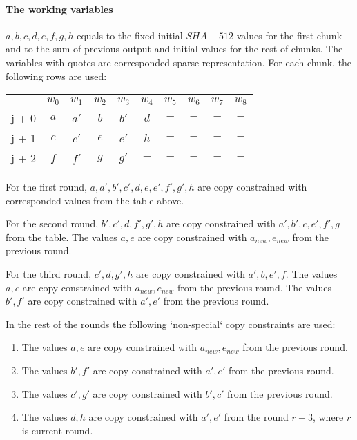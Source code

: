 \paragraph{The working variables}
$ a,  b , c , d, e, f, g, h$ equals to the fixed initial $SHA-512$ values for the first chunk and to the sum of previous output and initial values for the rest of chunks. 
The variables with quotes are corresponded sparse representation.
For each chunk, the following rows are used:
\begin{center}
    \begin{tabular}{ c|c|c|c|c|c|c|c|c|c }
        & $w_0$  & $w_1$  & $w_2$  & $w_3$  & $w_4$  & $w_5$ & $w_6$ & $w_7$ & $w_8$  \\
        \hline
        j + 0 & $a$ & $a'$ & $b$ & $b' $  & $d$  & $-$   & $-$ & $-$  & $-$   \\
        j + 1 & $c$  & $c'$ & $e$ & $e'$ & $h$ & $-$ & $-$ & $-$ & $-$ \\
        j + 2 & $f$ & $f'$ & $g$ & $g'$ & $-$ & $-$ & $-$ & $-$ & $-$\\
    \end{tabular}
\end{center}
For the first round, $a, a', b', c' , d, e, e', f', g', h$ are copy constrained with corresponded values from the table above.

For the second round, $b', c' , d, f', g', h$ are copy constrained with $a', b', c, e', f', g$ from the table.
The values $a, e$ are copy constrained with $a_{new}, e_{new}$ from the previous round.

For the third round, $c' , d, g', h$ are copy constrained with $a', b, e', f$.
The values $a, e$ are copy constrained with $a_{new}, e_{new}$ from the previous round.
The values $b', f'$ are copy constrained with $a', e'$ from the previous round.

In the rest of the rounds the following `non-special` copy constraints are used:
\begin{enumerate}
\item The values $a, e$ are copy constrained with $a_{new}, e_{new}$ from the previous round.
\item The values $b', f'$ are copy constrained with $a', e'$ from the previous round.
\item The values $c', g'$ are copy constrained with $b', c'$ from the previous round.
\item The values $d, h$ are copy constrained with $a', e'$ from the round $r - 3$, where $r$ is current round.
\end{enumerate}

